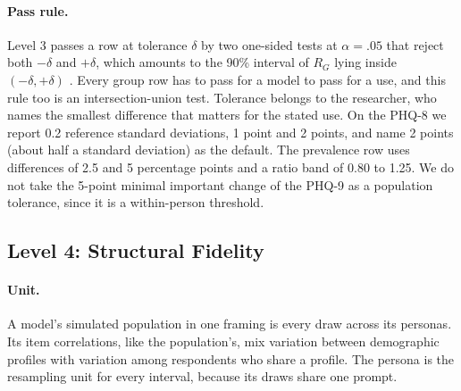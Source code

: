 \paragraph{Pass rule.}
Level 3 passes a row at tolerance $\delta$ by two one-sided tests at $\alpha = .05$ that reject both $-\delta$ and $+\delta$, which amounts to the 90\% interval of $R_G$ lying inside $(-\delta, +\delta)$ \citep{schuirmann1987tost,lakens2018tutorial}. Every group row has to pass for a model to pass for a use, and this rule too is an intersection-union test. Tolerance belongs to the researcher, who names the smallest difference that matters for the stated use. On the PHQ-8 we report 0.2 reference standard deviations, 1 point and 2 points, and name 2 points (about half a standard deviation) as the default. The prevalence row uses differences of 2.5 and 5 percentage points and a ratio band of 0.80 to 1.25. We do not take the 5-point minimal important change of the PHQ-9 \citep{lowe2004monitoring} as a population tolerance, since it is a within-person threshold.


\subsection*{Level 4: Structural Fidelity}
\label{sec:s7-l4}

\paragraph{Unit.}
A model's simulated population in one framing is every draw across its personas.
Its item correlations, like the population's, mix variation between demographic profiles with variation among respondents who share a profile.
The persona is the resampling unit for every interval, because its draws share one prompt.

